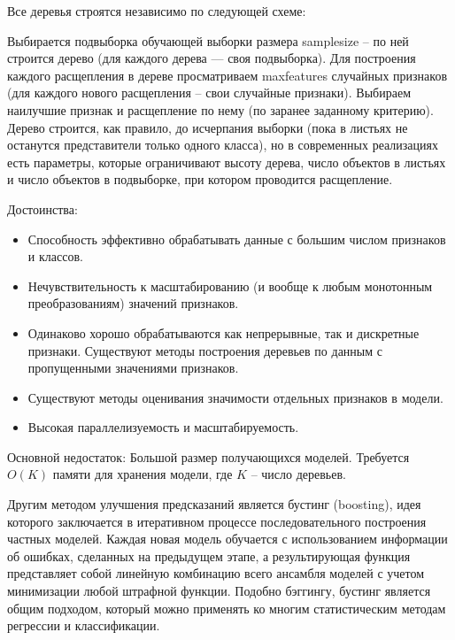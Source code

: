 \documentclass[a4paper, 12pt]{article}
\begin{document}
	Все деревья строятся независимо по следующей схеме:
	
	Выбирается подвыборка обучающей выборки размера samplesize -- по ней строится дерево (для каждого дерева — своя подвыборка).
	Для построения каждого расщепления в дереве просматриваем maxfeatures случайных признаков (для каждого нового расщепления -- свои случайные признаки).
	Выбираем наилучшие признак и расщепление по нему (по заранее заданному критерию). Дерево строится, как правило, до исчерпания выборки (пока в листьях не останутся представители только одного класса), но в современных реализациях есть параметры, которые ограничивают высоту дерева, число объектов в листьях и число объектов в подвыборке, при котором проводится расщепление.
	
	Достоинства:
	\begin{itemize}
		\item Способность эффективно обрабатывать данные с большим числом признаков и классов.
		\item Нечувствительность к масштабированию (и вообще к любым монотонным преобразованиям) значений признаков.
		\item Одинаково хорошо обрабатываются как непрерывные, так и дискретные признаки. Существуют методы построения деревьев по данным с пропущенными значениями признаков.
		\item Существуют методы оценивания значимости отдельных признаков в модели.
		\item Высокая параллелизуемость и масштабируемость.
	\end{itemize}
	Основной недостаток: Большой размер получающихся моделей. Требуется $O(K)$ памяти для хранения модели, где $K$ -- число деревьев.
	
	Другим методом улучшения предсказаний является бустинг (boosting), идея которого заключается в итеративном процессе последовательного построения частных моделей. Каждая новая модель обучается с использованием информации об ошибках, сделанных на предыдущем этапе, а результирующая функция представляет собой линейную комбинацию всего ансамбля моделей с учетом минимизации любой штрафной функции. Подобно бэггингу, бустинг является общим подходом, который можно применять ко многим статистическим методам регрессии и классификации.
	
\end{document}
